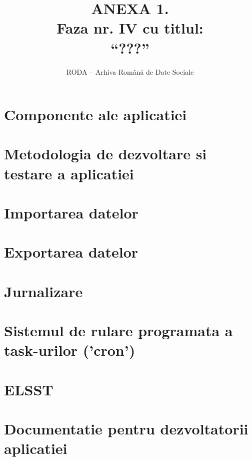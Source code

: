 \documentclass[11pt,twoside,romanian]{extbook}
\begin{document}
\fancyhead[RE,LO]{\thepage}


\title{ANEXA 1.\\
Faza nr. IV 
cu titlul:\\
``???''
}

\author{RODA -- Arhiva Rom\^{a}n\u{a} de Date Sociale}

\date{ }

\maketitle

\newpage
\thispagestyle{plain}
\tableofcontents{}
\setcounter{page}{1}

\chapter{Componente ale aplicatiei}


\chapter{Metodologia de dezvoltare si testare a aplicatiei}


\chapter{Importarea datelor}


\chapter{Exportarea datelor}


\chapter{Jurnalizare}


\chapter{Sistemul de rulare programata a task-urilor ('cron')}


\chapter{ELSST}


\chapter{Documentatie pentru dezvoltatorii aplicatiei} 

\end{document}
